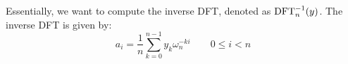 \begin{comment}
From \refequation{eq:uniq-poly-inter}, we can write the DFT as the matrix
product (we are multiplying the Vandermonde matrix $V_n$ containing the
appropriate powers of $\omega_n$ by $a$):
\begin{equation*}
  \begin{pmatrix*}
    y_0     \\
    y_1     \\
    y_2     \\
    \vdots  \\
    y_{n - 1}
  \end{pmatrix*}
  =
  \begin{pmatrix*}
    1     &    1          &    1            &\cdots&      1                 \\
    1     &\omega_n       &\omega_n^2       &\cdots&\omega_n^{n - 1}        \\
    1     &\omega_n^2     &\omega_n^4       &\cdots&\omega_n^{2(n - 1)}     \\
    \vdots&\vdots         &\vdots           &\ddots&\vdots                  \\
    1     &\omega_n^{n-1} &\omega_n^{2(n-1)}&\cdots&\omega_n^{(n-1)(n - 1)}
  \end{pmatrix*}
  \begin{pmatrix*}
    a_0     \\
    a_1     \\
    a_2     \\
    \vdots  \\
    a_{n-1}
  \end{pmatrix*}
\end{equation*}
Each $(i,k)$ entry of $V_n$ is $\omega_n^{i k}$ for $i, k = 0, \dotsc, n - 1$.

For the inverse operation, written as $a = \DFT_n^{-1}(y)$, and since we
known that $V_n$ is invertible, we proceed by multiplying $y$ by $V_n^{-1}$.

\begin{theorem}[{\autocite[Theorem~30.7]{Cormen:2009:IAT:1614191}}]
  For $i, k = 0, \dotsc, n - 1$, the $(i,k)$ entry of $V_n^{-1}$ is
  $\omega_n^{-k i}/n$.
  \label{theo:vande}
\end{theorem}
\end{comment}

Essentially, we want to compute the inverse DFT, denoted as  $\operatorname{DFT}_n^{-1}(y)$.
The inverse DFT is given by:
\begin{equation}
  a_i = \frac{1}{n} \sum_{k = 0}^{n - 1}{y_k \omega_n^{-k i}} \qquad 0 \leq
  i < n
  \label{eq:dft-inv}
\end{equation}

